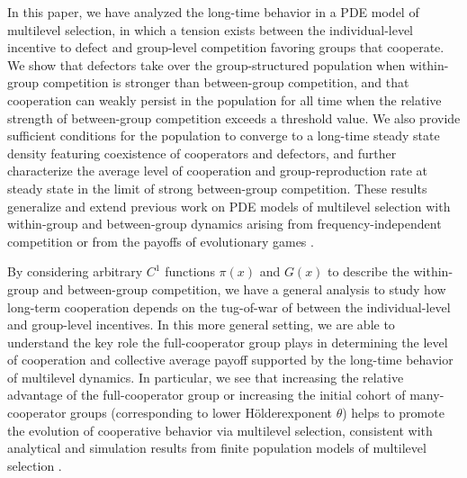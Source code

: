 \documentclass[11pt]{article}
\numberwithin{equation}{section}
\newcommand{\myindent}{\hspace{10mm}}
\newcommand{\holder}{H{\"o}lder\:}
\begin{document}
{In this paper, we have analyzed the long-time behavior in a PDE model of multilevel selection, in which a tension exists between the individual-level incentive to defect and group-level competition favoring groups that cooperate. We show that defectors take over the group-structured population when within-group competition is stronger than between-group competition, and that cooperation can weakly persist in the population for all time when the relative strength of between-group competition exceeds a threshold value. We also provide sufficient conditions for the population to converge to a long-time steady state density featuring coexistence of cooperators and defectors, and further characterize the average level of cooperation and group-reproduction rate at steady state in the limit of strong between-group competition. These results generalize and extend previous work on PDE models of multilevel selection with within-group and between-group dynamics arising from frequency-independent competition \cite{luo2014unifying,van2014simple,luo2017scaling} or from the payoffs of evolutionary games \cite{cooney2019replicator,cooney2020analysis,cooney2019assortment}.


\myindent By considering arbitrary $C^1$ functions $\pi(x)$ and $G(x)$ to describe the within-group and between-group competition, we have a general analysis to study how long-term cooperation depends on the tug-of-war of between the individual-level and group-level incentives. In this more general setting, we are able to understand the key role the full-cooperator group plays in determining the level of cooperation and collective average payoff supported by the long-time behavior of multilevel dynamics.  In particular, we see that increasing the relative advantage of the full-cooperator group or increasing the initial cohort of many-cooperator groups (corresponding to lower \holder exponent $\theta$) helps to promote the evolution of cooperative behavior via multilevel selection, consistent with analytical and simulation results from finite population models of multilevel selection \cite{markvoort2014computer,traulsen2006evolution,traulsen2008analytical}.

}
\end{document}
